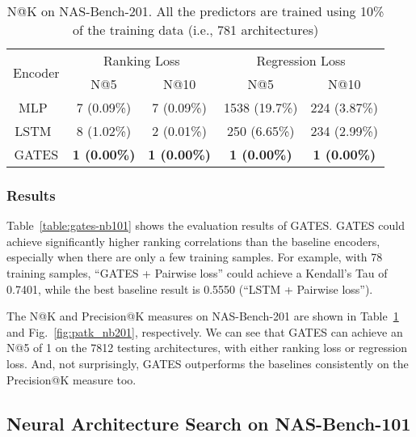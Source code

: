 \documentclass[runningheads]{llncs}
\begin{document}
\begin{table}[th]
  \caption{N@K on NAS-Bench-201. All the predictors are trained using 10\% of the training data (i.e., 781 architectures)}
  \label{table:natk-nb201}
  \begin{center}
    \begin{tabular}{c@{\hskip 0.02\linewidth}cccc}
      \toprule
      \multirow{2}{*}{Encoder} & \multicolumn{2}{c}{Ranking Loss} &  \multicolumn{2}{c}{Regression Loss} \\ 
      \cmidrule(lr){2-3}\cmidrule(lr){4-5} & N@5 & N@10 & N@5 & N@10  \\ \midrule
      MLP~\cite{wang2018alphax}  &    7 (0.09\%)    &    7 (0.09\%)   &   1538 (19.7\%)   &   224 (3.87\%)    \\
      LSTM~\cite{wang2018alphax}     &  8 (1.02\%)  &   2 (0.01\%) &  250 (6.65\%)   & 234 (2.99\%)  \\
      \hline
      GATES & {\bf 1 (0.00\%)} & {\bf 1 (0.00\%)} & {\bf 1 (0.00\%)} & {\bf 1 (0.00\%)} \\\bottomrule
    \end{tabular}
  \end{center}
\end{table}

\subsubsection{Results}
Table~\ref{table:gates-nb101} shows the evaluation results of GATES. GATES could achieve significantly higher ranking correlations than the baseline encoders, especially when there are only a few training samples. For example, with 78 training samples, ``GATES + Pairwise loss'' could achieve a Kendall's Tau of 0.7401, while the best baseline result is 0.5550 (``LSTM + Pairwise loss'').

The N@K and Precision@K measures on NAS-Bench-201 are shown in Table~\ref{table:natk-nb201} and Fig.~\ref{fig:patk_nb201}, respectively. 
We can see that GATES can achieve an N@5 of 1 on the 7812 testing architectures, with either ranking loss or regression loss. And, not surprisingly, GATES outperforms the baselines consistently on the Precision@K measure too.





\subsection{Neural Architecture Search on NAS-Bench-101}
\label{sec:exp-nas-nb101}
\end{document}
